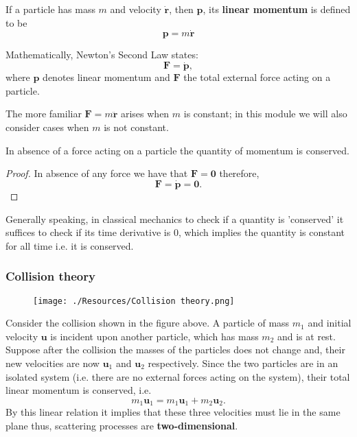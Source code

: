 \documentclass[12pt, a4paper]{article}
\begin{document}
\begin{definition}
    If a particle has mass \(m\) and velocity \(\dot{\bm{r}}\), then \(\bm{p}\), its \textbf{linear momentum} is defined to be
    \[\bm{p}=m\dot{\bm{r}}\]
\end{definition}

\begin{mdthm}
    Mathematically, Newton's Second Law states:
    \[\bm{F}=\dot{\bm{p}},\]
    where \(\bm{p}\) denotes linear momentum and \(\bm{F}\) the total external force acting on a particle.
\end{mdthm}

\begin{mdremark}
    The more familiar \(\bm{F}=m\ddot{\bm{r}}\) arises when \(m\) is constant; in this module we will also consider cases when \(m\) is not constant.
\end{mdremark}

\begin{theorem}
    In absence of a force acting on a particle the quantity of momentum is conserved.
\end{theorem}

\begin{proof}
    In absence of any force we have that \(\bm{F}=\bm{0}\) therefore,
    \[\bm{F}=\dot{\bm{p}}=\bm{0}.\]
\end{proof}

\begin{mdnote}
    Generally speaking, in classical mechanics to check if a quantity is 'conserved' it suffices to check if its time derivative is \(0\), which implies the quantity is constant for all time i.e. it is conserved.
\end{mdnote}

\subsubsection{Collision theory}

\begin{figure}[H]
    \begin{center}
        \texttt{[image: ./Resources/Collision theory.png]}
    \end{center}
\end{figure}

Consider the collision shown in the figure above. A particle of mass \(m_1\) and initial velocity \(\bm{u}\) is incident upon another particle, which has mass \(m_2\) and is at rest. Suppose after the collision the masses of the particles does not change and, their new velocities are now \(\bm{u}_1\) and \(\bm{u}_2\) respectively. Since the two particles are in an isolated system (i.e. there are no external forces acting on the system), their total linear momentum is conserved, i.e.
\[m_1\bm{u}_1 = m_1\bm{u}_1+m_2\bm{u}_2.\]
By this linear relation it implies that these three velocities must lie in the same plane thus, scattering processes are \textbf{two-dimensional}.
\end{document}
